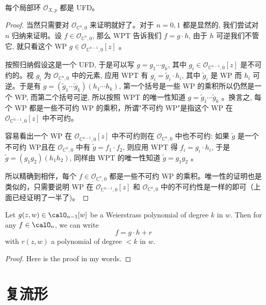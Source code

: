 \documentclass[lang=cn,12pt,fontset=none,a4paper]{beautybook}
\begin{document}
\begin{corollary}
   每个局部环 $\mathcal{O}_{X, p}$ 都是 UFD。
\end{corollary}
\begin{proof}
   当然只需要对 $\mathcal{O}_{\mathbb{C}^n, 0}$ 来证明就好了。对于 $n=0,1$ 都是显然的, 我们尝试对 $n$ 归纳来证明。设 $f \in \mathcal{O}_{\mathbb{C}^n, 0}$, 那么 WPT 告诉我们 $f=g \cdot h$, 由于 $h$ 可逆我们不管它, 就只看这个 WP $g \in \mathcal{O}_{\mathbb{C}^{n-1}, 0}[z]$ 。
   
   按照归纳假设这是一个 UFD, 于是可以写 $g=g_1 \cdots g_k$, 其中 $g_i \in \mathcal{O}_{\mathbb{C}^{n-1}, 0}[z]$ 是不可约的。视 $g_i$ 为 $\mathcal{O}_{\mathbb{C}^n, 0}$ 中的元素, 应用 WPT 有 $g_i=\tilde{g}_i \cdot h_i$, 其中 $\tilde{g}_i$ 是 WP 而 $h_i$ 可逆。于是有 $g=\left(\tilde{g}_1 \cdots \tilde{g}_k\right)\left(h_1 \cdots h_k\right)$, 第一个括号是一些 WP 的乘积所以仍然是一个 WP, 而第二个括号可逆, 所以按照 WPT 的唯一性知道 $g=\tilde{g}_1 \cdots \tilde{g}_k$ 。换言之, 每个 WP 都是一些不可约 WP 的乘积，所谓"不可约 WP"是指这个 WP 在 $\mathcal{O}_{\mathbb{C}^{n-1}, 0}[z]$ 中不可约。
   
   容易看出一个 WP 在 $\mathcal{O}_{\mathbb{C}^{n-1}, 0}[z]$ 中不可约则在 $\mathcal{O}_{\mathbb{C}^n, 0}$ 中也不可约: 如果 $\tilde{g}$ 是一个不可约 WP且在 $\mathcal{O}_{\mathbb{C}^n, 0}$ 中有 $\tilde{g}=f_1 \cdot f_2$, 则应用 WPT 得 $f_i=g_i \cdot h_i$, 于是 $\tilde{g}=\left(g_1 g_2\right)\left(h_1 h_2\right)$, 同样由 WPT 的唯一性知道 $\tilde{g}=g_1 g_2$ 。
   
   所以精确到相伴，每个 $f \in \mathcal{O}_{\mathbb{C}^n, 0}$ 都是一些不可约 WP 的乘积。唯一性的证明也是类似的，只需要说明 WP 在 $\mathcal{O}_{\mathbb{C}^{n-1}, 0}[z]$ 和 $\mathcal{O}_{\mathbb{C}^n, 0}$ 中的不可约性是一样的即可（上面已经证明了一半了)。
\end{proof}



\begin{theorem}
   Let $g(z,w)\in \calO_{n-1}[w]$ be a Weierstrass polynomial of degree $k$ in $w$. Then for any $f\in \calO_{n}$, we can write
   \[f=g\cdot h+r\]
   with $r(z,w)$ a polynomial of degree $<k$ in $w$.
\end{theorem}
\begin{proof}
   Here is the proof in my words.
   
\end{proof}

\section{复流形}
\end{document}
